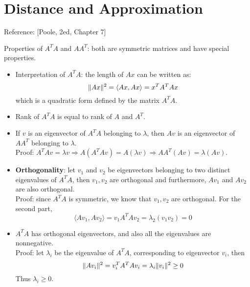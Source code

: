 \documentclass{report}
\begin{document}
\section{Distance and Approximation}

Reference: [Poole, 2ed, Chapter 7]

Properties of $A^T A$ and $A A^T$: both are symmetric matrices and have special properties. 
\begin{itemize}
	\item Interpretation of $A^T A$: the length of $Ax$ can be written as: 
	\begin{equation}
	\lVert Ax\rVert^2 = \langle Ax, Ax \rangle = x^T A^T A x
	\end{equation} 
	which is a quadratic form defined by the matrix $A^T A$. 
	
	\item Rank of $A^T A$ is equal to rank of $A$ and $A^T$. 
		
	\item If $v$ is an eigenvector of $A^T A$ belonging to $\lambda$, then $Av$ is an eigenvector of $A A^T$ belonging to $\lambda$. \\
	Proof: $A^T A v = \lambda v \Rightarrow A (A^T Av) = A (\lambda v) \Rightarrow A A^T (Av) = \lambda (Av)$. 
	
	\item \textbf{Orthogonality}: let $v_1$ and $v_2$ be eigenvectors belonging to two distinct eigenvalues of $A^T A$, then $v_1, v_2$ are orthogonal and furthermore, $Av_1$ and $A v_2$ are also orthogonal. \\
	Proof: since $A^T A$ is symmetric, we know that $v_1, v_2$ are orthogonal. For the second part, 
\begin{equation}
\langle A v_1, A v_2 \rangle = v_1 A^T A v_2 = \lambda_2 (v_1 v_2) = 0
\end{equation}
	
	\item $A^T A$ has orthogonal eigenvectors, and also all the eigenvalues are nonnegative. \\
	Proof: let $\lambda_i$ be the eigenvalue of $A^T A$, corresponding to eigenvector $v_i$, then
	\begin{equation}
	\lVert Av_i\rVert^2 = v_i^T A^T A v_i = \lambda_i \lVert v_i\rVert^2 \geq 0
	\end{equation}
	Thus $\lambda_i \geq 0$. 
\end{itemize}
\end{document}
